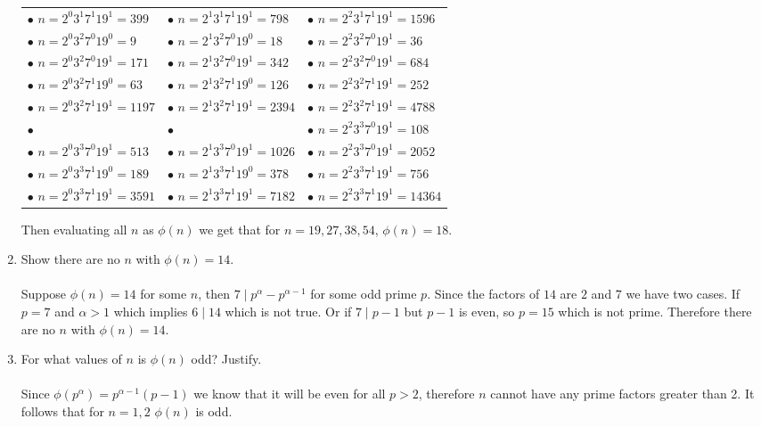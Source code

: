\documentclass[class=article, crop=false]{standalone}
\begin{document}
\begin{enumerate}
\begin{center}
\begin{tabular}{ l l l }
	  $\bullet$ $n=2^0 3^1 7^1 19^1 = 399$ &   $\bullet$ $n=2^1 3^1 7^1 19^1 = 798$ & $\bullet$ $n=2^2 3^1 7^1 19^1 = 1596$\\
	  $\bullet$ $n=2^0 3^2 7^0 19^0 = 9$ &    $\bullet$ $n=2^1 3^2 7^0 19^0 = 18$ & $\bullet$ $n=2^2 3^2 7^0 19^1 = 36$\\
	  $\bullet$ $n=2^0 3^2 7^0 19^1 = 171$ &   $\bullet$ $n=2^1 3^2 7^0 19^1 = 342$ & $\bullet$ $n=2^2 3^2 7^0 19^1 = 684$\\
	  $\bullet$ $n=2^0 3^2 7^1 19^0 = 63$ &    $\bullet$ $n=2^1 3^2 7^1 19^0 = 126$ & $\bullet$ $n=2^2 3^2 7^1 19^1 = 252$\\
	  $\bullet$ $n=2^0 3^2 7^1 19^1 = 1197$ &   $\bullet$ $n=2^1 3^2 7^1 19^1 = 2394$ & $\bullet$ $n=2^2 3^2 7^1 19^1 = 4788$\\
	  $\bullet$\fbox{$n=2^0 3^3 7^0 19^0 = 27$} &    $\bullet$\fbox{$n=2^1 3^3 7^0 19^0 = 54$} & $\bullet$ $n=2^2 3^3 7^0 19^1 = 108$\\
	  $\bullet$ $n=2^0 3^3 7^0 19^1 = 513$ &   $\bullet$ $n=2^1 3^3 7^0 19^1 = 1026$ & $\bullet$ $n=2^2 3^3 7^0 19^1 = 2052$\\
	  $\bullet$ $n=2^0 3^3 7^1 19^0 = 189$ &    $\bullet$ $n=2^1 3^3 7^1 19^0 = 378$ & $\bullet$ $n=2^2 3^3 7^1 19^1 = 756$\\
	  $\bullet$ $n=2^0 3^3 7^1 19^1 = 3591$ &   $\bullet$ $n=2^1 3^3 7^1 19^1 = 7182$ & $\bullet$ $n=2^2 3^3 7^1 19^1 = 14364$
	\end{tabular}
  \end{center}
  Then evaluating all $n$ as $\phi(n)$ we get that for $n=19,27,38,54$, $\phi(n)=18$.

\item
  Show there are no $n$ with $\phi(n)=14$. \\\\
  Suppose $\phi(n)=14$ for some $n$, then $7\mid p^{\alpha} - p^{\alpha -1}$
  for some odd prime $p$. Since the factors of $14$ are $2$ and $7$ we have two cases.
  If $p=7$ and $\alpha >1$ which implies $6\mid 14$ which is not true.
  Or if $7\mid p-1$ but $p-1$ is even, so $p=15$ which is not prime. Therefore
  there are no $n$ with $\phi(n)=14$.

\item
  For what values of $n$ is $\phi(n)$ odd?
  Justify. \\\\
  Since $\phi(p^{\alpha})=p^{\alpha - 1} (p-1)$ we know that it will be even for all $p>2$,
  therefore $n$ cannot have any prime factors greater than 2. It follows that for $n=1,2$
  $\phi(n)$ is odd.


\end{enumerate}
\end{document}
